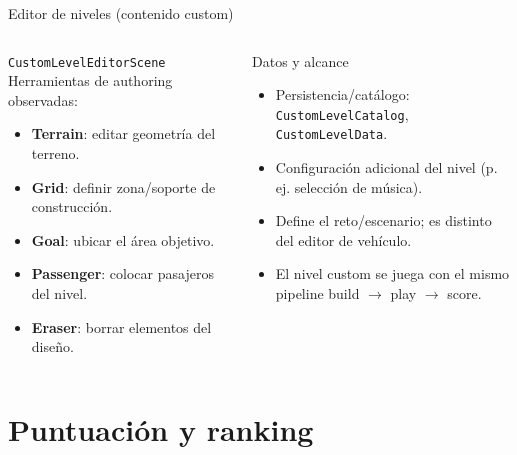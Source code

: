 \documentclass[aspectratio=169,11pt]{beamer}
\begin{document}
\begin{frame}{Editor de niveles (contenido custom)}
  \begin{columns}[T]
    \begin{block}{\texttt{CustomLevelEditorScene}}
      Herramientas de authoring observadas:
      \begin{itemize}
        \item \textbf{Terrain}: editar geometría del terreno.
        \item \textbf{Grid}: definir zona/soporte de construcción.
        \item \textbf{Goal}: ubicar el área objetivo.
        \item \textbf{Passenger}: colocar pasajeros del nivel.
        \item \textbf{Eraser}: borrar elementos del diseño.
      \end{itemize}
    \end{block}
    \begin{block}{Datos y alcance}
      \begin{itemize}
        \item Persistencia/catálogo: \texttt{CustomLevelCatalog}, \texttt{CustomLevelData}.
        \item Configuración adicional del nivel (p. ej. selección de música).
        \item Define el reto/escenario; es distinto del editor de vehículo.
        \item El nivel custom se juega con el mismo pipeline build $\rightarrow$ play $\rightarrow$ score.
      \end{itemize}
    \end{block}
  \end{columns}
\end{frame}

\section{Puntuación y ranking}
\end{document}
